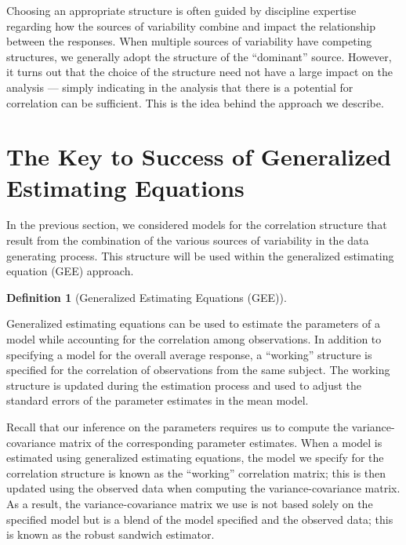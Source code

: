 \documentclass[
  letterpaper,
  DIV=11,
  numbers=noendperiod]{scrreprt}
\theoremstyle{definition}
\newtheorem{definition}{Definition}[chapter]
\theoremstyle{definition}
\theoremstyle{remark}
\begin{document}
Choosing an appropriate structure is often guided by discipline
expertise regarding how the sources of variability combine and impact
the relationship between the responses. When multiple sources of
variability have competing structures, we generally adopt the structure
of the ``dominant'' source. However, it turns out that the choice of the
structure need not have a large impact on the analysis --- simply
indicating in the analysis that there is a potential for correlation can
be sufficient. This is the idea behind the approach we describe.

\hypertarget{the-key-to-success-of-generalized-estimating-equations}{%
\section{The Key to Success of Generalized Estimating
Equations}\label{the-key-to-success-of-generalized-estimating-equations}}

In the previous section, we considered models for the correlation
structure that result from the combination of the various sources of
variability in the data generating process. This structure will be used
within the generalized estimating equation (GEE) approach.

\begin{definition}[Generalized Estimating Equations
(GEE)]\protect\hypertarget{def-gee}{}\label{def-gee}

Generalized estimating equations can be used to estimate the parameters
of a model while accounting for the correlation among observations. In
addition to specifying a model for the overall average response, a
``working'' structure is specified for the correlation of observations
from the same subject. The working structure is updated during the
estimation process and used to adjust the standard errors of the
parameter estimates in the mean model.

\end{definition}

Recall that our inference on the parameters requires us to compute the
variance-covariance matrix of the corresponding parameter estimates.
When a model is estimated using generalized estimating equations, the
model we specify for the correlation structure is known as the
``working'' correlation matrix; this is then updated using the observed
data when computing the variance-covariance matrix. As a result, the
variance-covariance matrix we use is not based solely on the specified
model but is a blend of the model specified and the observed data; this
is known as the robust sandwich estimator.
\end{document}
